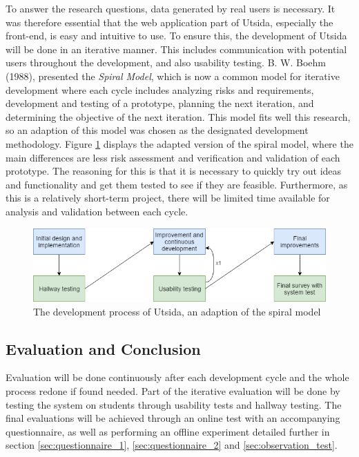 To answer the research questions, data generated by real users is necessary. It was therefore essential that the web application part of Utsida, especially the front-end, is easy and intuitive to use. To ensure this, the development of Utsida will be done in an iterative manner. This includes communication with potential users throughout the development, and also usability testing. B. W. Boehm (1988)\cite{boehm1988spiral}, presented the \emph{Spiral Model}, which is now a common model for iterative development where each cycle includes analyzing risks and requirements, development and testing of a prototype, planning the next iteration, and determining the objective of the next iteration. This model fits well this research, so an adaption of this model was chosen as the designated development methodology. Figure \ref{fig:development_process} displays the adapted version of the spiral model, where the main differences are less risk assessment and verification and validation of each prototype. The reasoning for this is that it is necessary to quickly try out ideas and functionality and get them tested to see if they are feasible. Furthermore, as this is a relatively short-term project, there will be limited time available for analysis and validation between each cycle.

\begin{figure}[h]
    \centering
    \includegraphics[width=1\textwidth]{fig/development_process.png}
    \caption{The development process of Utsida, an adaption of the spiral model\cite{oehm1988spiral}}
    \label{fig:development_process}
\end{figure}

\subsection{Evaluation and Conclusion}
Evaluation will be done continuously after each development cycle and the whole process redone if found needed. Part of the iterative evaluation will be done by testing the system on students through usability tests and hallway testing. The final evaluations will be achieved through an online test with an accompanying questionnaire, as well as performing an offline experiment detailed further in section \ref{sec:questionnaire_1}, \ref{sec:questionnaire_2} and \ref{sec:observation_test}.

